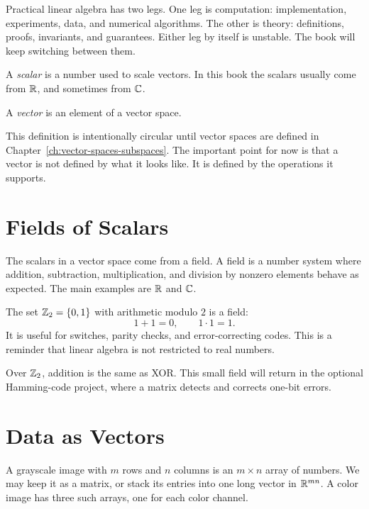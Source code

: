 \begin{remark}
Practical linear algebra has two legs. One leg is computation: implementation,
experiments, data, and numerical algorithms. The other is theory: definitions,
proofs, invariants, and guarantees. Either leg by itself is unstable. The book
will keep switching between them.
\end{remark}

\begin{definition}
  A \emph{scalar} is a number used to scale vectors. In this book the scalars
  usually come from $\mathbb{R}$, and sometimes from $\mathbb{C}$.
\end{definition}

\begin{definition}
  A \emph{vector} is an element of a vector space.
\end{definition}

This definition is intentionally circular until vector spaces are defined in
Chapter~\ref{ch:vector-spaces-subspaces}. The important point for now is that a
vector is not defined by what it looks like. It is defined by the operations it
supports.

\section{Fields of Scalars}

The scalars in a vector space come from a field. A field is a number system
where addition, subtraction, multiplication, and division by nonzero elements
behave as expected. The main examples are $\mathbb{R}$ and $\mathbb{C}$.

\begin{example}
The set $\mathbb{Z}_2=\{0,1\}$ with arithmetic modulo $2$ is a field:
\[
  1+1=0,\qquad 1\cdot 1=1.
\]
It is useful for switches, parity checks, and error-correcting codes. This is
a reminder that linear algebra is not restricted to real numbers.
\end{example}

Over $\mathbb{Z}_2$, addition is the same as XOR. This small field will return in the
optional Hamming-code project, where a matrix detects and corrects one-bit
errors.

\section{Data as Vectors}

A grayscale image with $m$ rows and $n$ columns is an $m\times n$ array of
numbers. We may keep it as a matrix, or stack its entries into one long vector
in $\mathbb{R}^{mn}$. A color image has three such arrays, one for each color channel.

